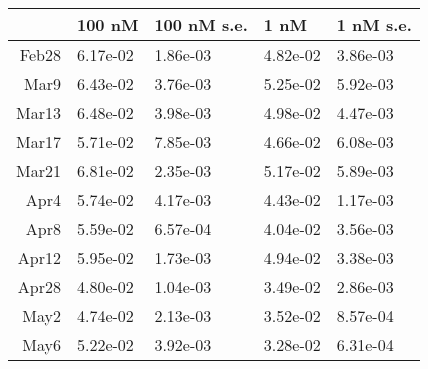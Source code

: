 \documentclass{article}
\begin{document}
\begin{table}[ht]
\centering
\begin{tabular}{rllll}
  \hline
 & 100 nM & 100 nM s.e. & 1 nM & 1 nM s.e. \\ 
  \hline
Feb28 & 6.17e-02 & 1.86e-03 & 4.82e-02 & 3.86e-03 \\ 
  Mar9 & 6.43e-02 & 3.76e-03 & 5.25e-02 & 5.92e-03 \\ 
  Mar13 & 6.48e-02 & 3.98e-03 & 4.98e-02 & 4.47e-03 \\ 
  Mar17 & 5.71e-02 & 7.85e-03 & 4.66e-02 & 6.08e-03 \\ 
  Mar21 & 6.81e-02 & 2.35e-03 & 5.17e-02 & 5.89e-03 \\ 
  Apr4 & 5.74e-02 & 4.17e-03 & 4.43e-02 & 1.17e-03 \\ 
  Apr8 & 5.59e-02 & 6.57e-04 & 4.04e-02 & 3.56e-03 \\ 
  Apr12 & 5.95e-02 & 1.73e-03 & 4.94e-02 & 3.38e-03 \\ 
  Apr28 & 4.80e-02 & 1.04e-03 & 3.49e-02 & 2.86e-03 \\ 
  May2 & 4.74e-02 & 2.13e-03 & 3.52e-02 & 8.57e-04 \\ 
  May6 & 5.22e-02 & 3.92e-03 & 3.28e-02 & 6.31e-04 \\ 
   \hline
\end{tabular}
\end{table}
\end{document}
